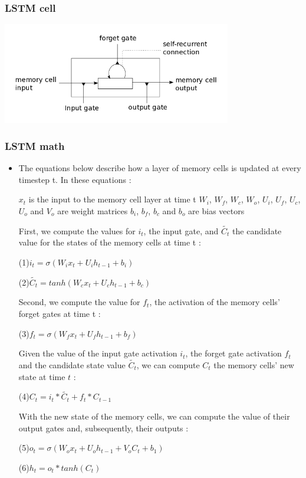 \documentclass[utf8x,xcolor=pdftex,dvipsnames,table]{beamer}
\begin{document}
\begin{frame}
  \frametitle{LSTM cell}
\includegraphics[width=0.75\textwidth]{../images/lstm_memorycell.png}
\end{frame}

\begin{frame}
  \frametitle{LSTM math}
\begin{itemize}
\item The equations below describe how a layer of memory cells is updated at every timestep t. In these equations :

    $x_t$ is the input to the memory cell layer at time t
    $W_i$, $W_f$, $W_c$, $W_o$, $U_i$, $U_f$, $U_c$, $U_o$ and $V_o$ are weight matrices
    $b_i$, $b_f$, $b_c$ and $b_o$ are bias vectors

First, we compute the values for $i_t$, the input gate, and $\widetilde{C_t}$ the candidate value for the states of the memory cells at time t :

(1)$i_t = \sigma(W_i x_t + U_i h_{t-1} + b_i)$

(2)$\widetilde{C_t} = tanh(W_c x_t + U_c h_{t-1} + b_c)$

Second, we compute the value for $f_t$, the activation of the memory cells’ forget gates at time t :

(3)$f_t = \sigma(W_f x_t + U_f h_{t-1} + b_f)$

Given the value of the input gate activation $i_t$, the forget gate activation $f_t$ and the candidate state value $\widetilde{C_t}$, we can compute $C_t$ the memory cells’ new state at time $t$ :

(4)$C_t = i_t * \widetilde{C_t} + f_t * C_{t-1}$

With the new state of the memory cells, we can compute the value of their output gates and, subsequently, their outputs :

(5)$o_t = \sigma(W_o x_t + U_o h_{t-1} + V_o C_t + b_1)$

(6)$h_t = o_t * tanh(C_t)$

\end{itemize}
\end{frame}
\end{document}

